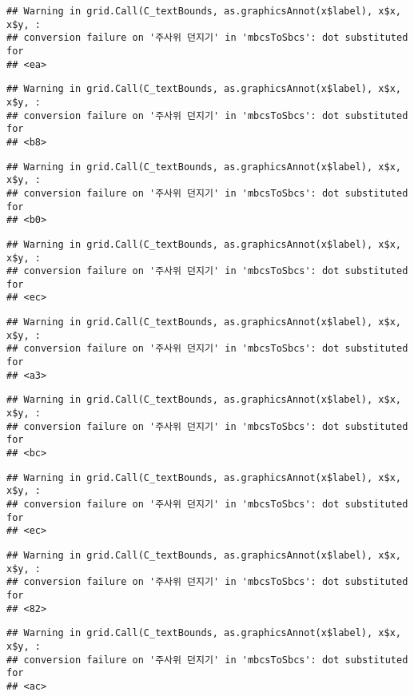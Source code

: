\documentclass[]{book}
\begin{document}
\begin{verbatim}
## Warning in grid.Call(C_textBounds, as.graphicsAnnot(x$label), x$x, x$y, :
## conversion failure on '주사위 던지기' in 'mbcsToSbcs': dot substituted for
## <ea>
\end{verbatim}

\begin{verbatim}
## Warning in grid.Call(C_textBounds, as.graphicsAnnot(x$label), x$x, x$y, :
## conversion failure on '주사위 던지기' in 'mbcsToSbcs': dot substituted for
## <b8>
\end{verbatim}

\begin{verbatim}
## Warning in grid.Call(C_textBounds, as.graphicsAnnot(x$label), x$x, x$y, :
## conversion failure on '주사위 던지기' in 'mbcsToSbcs': dot substituted for
## <b0>
\end{verbatim}

\begin{verbatim}
## Warning in grid.Call(C_textBounds, as.graphicsAnnot(x$label), x$x, x$y, :
## conversion failure on '주사위 던지기' in 'mbcsToSbcs': dot substituted for
## <ec>
\end{verbatim}

\begin{verbatim}
## Warning in grid.Call(C_textBounds, as.graphicsAnnot(x$label), x$x, x$y, :
## conversion failure on '주사위 던지기' in 'mbcsToSbcs': dot substituted for
## <a3>
\end{verbatim}

\begin{verbatim}
## Warning in grid.Call(C_textBounds, as.graphicsAnnot(x$label), x$x, x$y, :
## conversion failure on '주사위 던지기' in 'mbcsToSbcs': dot substituted for
## <bc>
\end{verbatim}

\begin{verbatim}
## Warning in grid.Call(C_textBounds, as.graphicsAnnot(x$label), x$x, x$y, :
## conversion failure on '주사위 던지기' in 'mbcsToSbcs': dot substituted for
## <ec>
\end{verbatim}

\begin{verbatim}
## Warning in grid.Call(C_textBounds, as.graphicsAnnot(x$label), x$x, x$y, :
## conversion failure on '주사위 던지기' in 'mbcsToSbcs': dot substituted for
## <82>
\end{verbatim}

\begin{verbatim}
## Warning in grid.Call(C_textBounds, as.graphicsAnnot(x$label), x$x, x$y, :
## conversion failure on '주사위 던지기' in 'mbcsToSbcs': dot substituted for
## <ac>
\end{verbatim}
\end{document}
